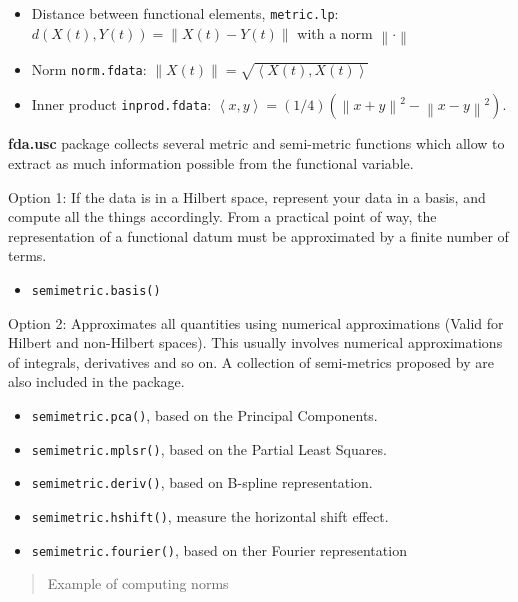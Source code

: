 \documentclass[
]{book}
\providecommand{\tightlist}{%
  \setlength{\itemsep}{0pt}\setlength{\parskip}{0pt}}
\begin{document}
\begin{itemize}
\item
  Distance between functional elements, \texttt{metric.lp}: \(d(X(t),Y(t))=\left\|X(t)-Y(t)\right\|\) with a norm \(\left\| \cdot \right\|\)
\item
  Norm \texttt{norm.fdata}:
  \(\left\|X(t)\right\|=\sqrt{\left\langle X(t),X(t)\right\rangle}\)
\item
  Inner product \texttt{inprod.fdata}:
  \(\left\langle x,y \right\rangle=(1/4)(\left\|x+y\right\|^2-\left\|x-y\right\|^2)\).
\end{itemize}

\textbf{fda.usc} package collects several metric and semi-metric functions which allow to extract as much information possible from the functional variable.

Option 1: If the data is in a Hilbert space, represent your data in a basis, and compute all the things accordingly. From a practical point of way, the representation of a functional datum
must be approximated by a finite number of terms.

\begin{itemize}
\tightlist
\item
  \texttt{semimetric.basis()}
\end{itemize}

Option 2: Approximates all quantities using numerical approximations (Valid for Hilbert and non-Hilbert spaces). This usually involves numerical approximations of integrals, derivatives and so on. A collection of semi-metrics proposed by \citep{FV2006} are also included in the package.

\begin{itemize}
\tightlist
\item
  \texttt{semimetric.pca()}, based on the Principal Components.
\item
  \texttt{semimetric.mplsr()}, based on the Partial Least Squares.\\
\item
  \texttt{semimetric.deriv()}, based on B-spline representation.
\item
  \texttt{semimetric.hshift()}, measure the horizontal shift effect.
\item
  \texttt{semimetric.fourier()}, based on ther Fourier representation
\end{itemize}

\begin{quote}
Example of computing norms
\end{quote}
\end{document}
